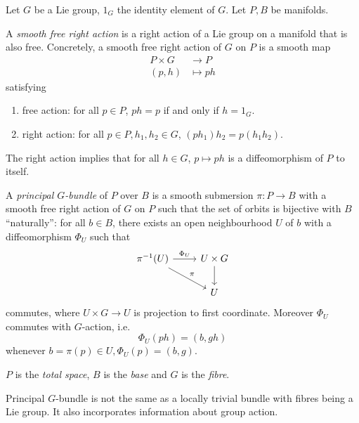 \documentclass[a4paper]{article}
\begin{document}
Let \(G\) be a Lie group, \(1_G\) the identity element of \(G\). Let \(P, B\) be manifolds.

\begin{definition}
  A \emph{smooth free right action} is a right action of a Lie group on a manifold that is also free. Concretely, a smooth free right action of \(G\) on \(P\) is a smooth map
  \begin{align*}
    P \times G &\to P \\
    (p, h) &\mapsto ph
  \end{align*}
  satisfying
  \begin{enumerate}
  \item free action: for all \(p \in P\), \(ph = p\) if and only if \(h = 1_G\).
  \item right action: for all \(p \in P, h_1, h_2 \in G\), \((ph_1)h_2 = p(h_1h_2)\).
  \end{enumerate}
\end{definition}

\begin{note}
  The right action implies that for all \(h \in G\), \(p \mapsto ph\) is a diffeomorphism of \(P\) to itself.
\end{note}

\begin{definition}
  A \emph{principal \(G\)-bundle} of \(P\) over \(B\) is a smooth submersion \(\pi: P \to B\) with a smooth free right action of \(G\) on \(P\) such that the set of orbits is bijective with \(B\) ``naturally'': for all \(b \in B\), there exists an open neighbourhood \(U\) of \(b\) with a diffeomorphism \(\Phi_U\) such that
  \[
    \begin{tikzcd}
      \pi^{-1}(U) \ar[r, "\Phi_U"] \ar[dr, "\pi"] & U \times G \ar[d] \\
      & U
    \end{tikzcd}
  \]
  commutes, where \(U \times G \to U\) is projection to first coordinate. Moreover \(\Phi_U\) commutes with \(G\)-action, i.e.
  \[
    \Phi_U(ph) = (b, gh)
  \]
  whenever \(b = \pi(p) \in U, \Phi_U(p) = (b, g)\).

  \(P\) is the \emph{total space}, \(B\) is the \emph{base} and \(G\) is the \emph{fibre}.
\end{definition}

\begin{note}
  Principal \(G\)-bundle is not the same as a locally trivial bundle with fibres being a Lie group. It also incorporates information about group action.
\end{note}
\end{document}
